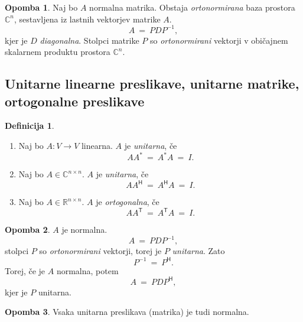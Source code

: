 \documentclass[11pt]{article}
\newcommand{\R}{\mathbb{R}}
\newcommand{\0}{\mathbf{0}}
\newcommand{\T}{\mathsf{T}}
\renewcommand{\H}{\mathsf{H}}
\theoremstyle{definition}
\newtheorem{definicija}{Definicija}[section]
\theoremstyle{definition}
\theoremstyle{definition}
\theoremstyle{definition}
\newtheorem*{opomba}{Opomba}
\begin{document}
\begin{opomba}

Naj bo $A$ normalna matrika. Obstaja \textit{ortonormirana} baza prostora $\mathbb{C}^n$, sestavljena iz lastnih vektorjev matrike $A$.
$$A ~=~ PDP^{-1},$$
kjer je $D$ \textit{diagonalna}. Stolpci matrike $P$ so \textit{ortonormirani} vektorji v običajnem skalarnem produktu prostora $\mathbb{C}^n$.

\end{opomba}
\vspace{0.5cm}


\subsection{Unitarne linearne preslikave, unitarne matrike, \\ortogonalne preslikave}
\vspace{0.5cm}

\begin{definicija}
~
\begin{enumerate}

\item Naj bo $A: V \rightarrow V$ linearna. $A$ je \textit{unitarna}, če 
$$AA^* ~=~ A^*A ~=~ I.$$

\item Naj bo $A \in \mathbb{C}^{n \times n}$. $A$ je \textit{unitarna}, če
$$AA^\H ~=~ A^\H A ~=~ I.$$

\item Naj bo $A \in \R^{n \times n}$. $A$ je \textit{ortogonalna}, če
$$AA^\T ~=~ A^\T A ~=~ I.$$

\end{enumerate}

\end{definicija}
\vspace{0.5cm}

\begin{opomba}

$A$ je normalna.
$$A ~=~ PDP^{-1},$$
stolpci $P$ so \textit{ortonormirani} vektorji, torej je $P$ \textit{unitarna}. Zato
$$P^{-1} ~=~ P^\H.$$
Torej, če je $A$ normalna, potem 
$$A ~=~ PDP^\H,$$
kjer je $P$ unitarna.

\end{opomba}
\vspace{0.5cm}

\begin{opomba}

Vsaka unitarna preslikava (matrika) je tudi normalna.

\end{opomba}
\vspace{0.5cm}
\end{document}
